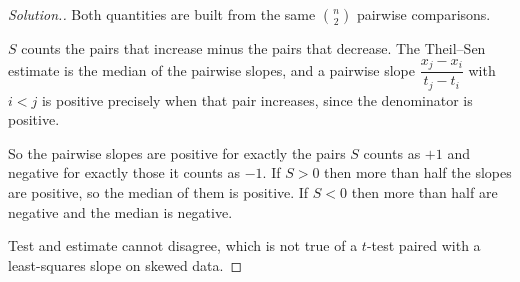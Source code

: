 \documentclass[11pt,a4paper]{article}
\theoremstyle{definition}
\newenvironment{solution}
  {\renewcommand{\qedsymbol}{}\begin{proof}[\textit{Solution}.]}
  {\end{proof}}
\begin{document}
\begin{solution}
Both quantities are built from the same $\binom{n}{2}$ pairwise comparisons.

$S$ counts the pairs that increase minus the pairs that decrease. The Theil--Sen
estimate is the median of the pairwise slopes, and a pairwise slope
$\dfrac{x_j - x_i}{t_j - t_i}$ with $i < j$ is positive precisely when that pair
increases, since the denominator is positive.

So the pairwise slopes are positive for exactly the pairs $S$ counts as $+1$ and
negative for exactly those it counts as $-1$. If $S > 0$ then more than half the
slopes are positive, so the median of them is positive. If $S < 0$ then more than
half are negative and the median is negative.

Test and estimate cannot disagree, which is not true of a $t$-test paired with a
least-squares slope on skewed data.
\end{solution}
\end{document}
